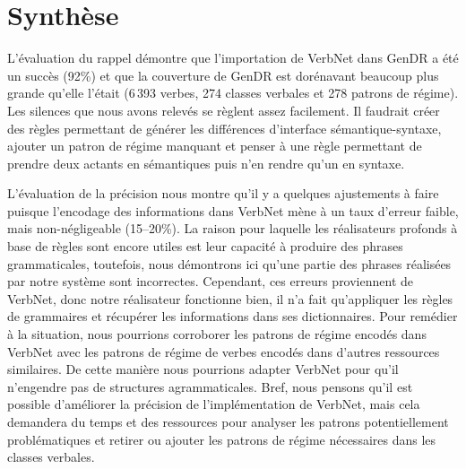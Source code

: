 \section{Synthèse}

L'évaluation du rappel démontre que l'importation de VerbNet dans GenDR a été un succès (92\%) et que la couverture de GenDR est dorénavant beaucoup plus grande qu'elle l'était (6\,393 verbes, 274 classes verbales et 278 patrons de régime). Les silences que nous avons relevés se règlent assez facilement. Il faudrait créer des règles permettant de générer les différences d'interface sémantique-syntaxe, ajouter un patron de régime manquant et penser à une règle permettant de prendre deux actants en sémantiques puis n'en rendre qu'un en syntaxe.

L'évaluation de la précision nous montre qu'il y a quelques ajustements à faire puisque l'encodage des informations dans VerbNet mène à un taux d'erreur faible, mais non-négligeable (15--20\%). La raison pour laquelle les réalisateurs profonds à base de règles sont encore utiles est leur capacité à produire des phrases grammaticales, toutefois, nous démontrons ici qu'une partie des phrases réalisées par notre système sont incorrectes. Cependant, ces erreurs proviennent de VerbNet, donc notre réalisateur fonctionne bien, il n'a fait qu'appliquer les règles de grammaires et récupérer les informations dans ses dictionnaires. Pour remédier à la situation, nous pourrions corroborer les patrons de régime encodés dans VerbNet avec les patrons de régime de verbes encodés dans d'autres ressources similaires. De cette manière nous pourrions adapter VerbNet pour qu'il n'engendre pas de structures agrammaticales. Bref, nous pensons qu'il est possible d'améliorer la précision de l'implémentation de VerbNet, mais cela demandera du temps et des ressources pour analyser les patrons potentiellement problématiques et retirer ou ajouter les patrons de régime nécessaires dans les classes verbales.

